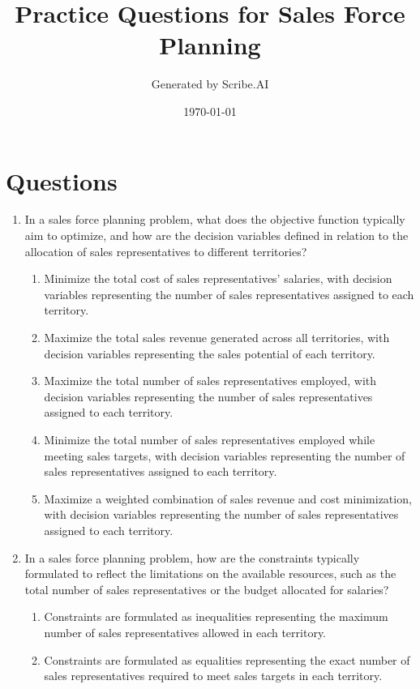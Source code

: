 \documentclass{article}%
\title{Practice Questions for Sales Force Planning}%
\author{Generated by Scribe.AI}%
\date{\today}%
\begin{document}
%
\normalsize%
\maketitle%
\section{Questions}%
\label{sec:Questions}%
\begin{enumerate}%
\item In a sales force planning problem, what does the objective function typically aim to optimize, and how are the decision variables defined in relation to the allocation of sales representatives to different territories?%
\begin{enumerate}%
\item Minimize the total cost of sales representatives' salaries, with decision variables representing the number of sales representatives assigned to each territory.%
\item Maximize the total sales revenue generated across all territories, with decision variables representing the sales potential of each territory.%
\item Maximize the total number of sales representatives employed, with decision variables representing the number of sales representatives assigned to each territory.%
\item Minimize the total number of sales representatives employed while meeting sales targets, with decision variables representing the number of sales representatives assigned to each territory.%
\item Maximize a weighted combination of sales revenue and cost minimization, with decision variables representing the number of sales representatives assigned to each territory.%
\end{enumerate}%
\vspace{1em}%
\item In a sales force planning problem, how are the constraints typically formulated to reflect the limitations on the available resources, such as the total number of sales representatives or the budget allocated for salaries?%
\begin{enumerate}%
\item Constraints are formulated as inequalities representing the maximum number of sales representatives allowed in each territory.%
\item Constraints are formulated as equalities representing the exact number of sales representatives required to meet sales targets in each territory.%

\end{enumerate}
\end{enumerate}
\end{document}
